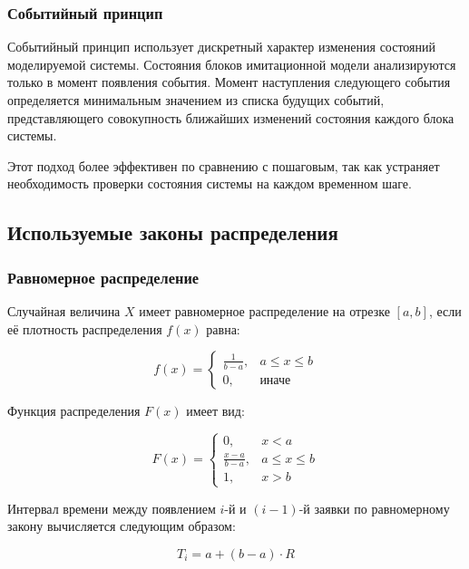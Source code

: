 \subsubsection{Событийный принцип}

Событийный принцип использует дискретный характер изменения состояний моделируемой системы. Состояния блоков имитационной модели анализируются только в момент появления события. Момент наступления следующего события определяется минимальным значением из списка будущих событий, представляющего совокупность ближайших изменений состояния каждого блока системы.

Этот подход более эффективен по сравнению с пошаговым, так как устраняет необходимость проверки состояния системы на каждом временном шаге.

\subsection{Используемые законы распределения}

\subsubsection{Равномерное распределение}

Случайная величина $X$ имеет равномерное распределение на отрезке $[a, b]$, если её плотность распределения $f(x)$ равна:

\begin{equation}
f(x) = \begin{cases}
\frac{1}{b-a}, & a \leq x \leq b \\
0, & \text{иначе}
\end{cases}
\end{equation}

Функция распределения $F(x)$ имеет вид:

\begin{equation}
F(x) = \begin{cases}
0, & x < a \\
\frac{x-a}{b-a}, & a \leq x \leq b \\
1, & x > b
\end{cases}
\end{equation}

Интервал времени между появлением $i$-й и $(i-1)$-й заявки по равномерному закону вычисляется следующим образом:

\begin{equation}
T_i = a + (b - a) \cdot R
\end{equation}

